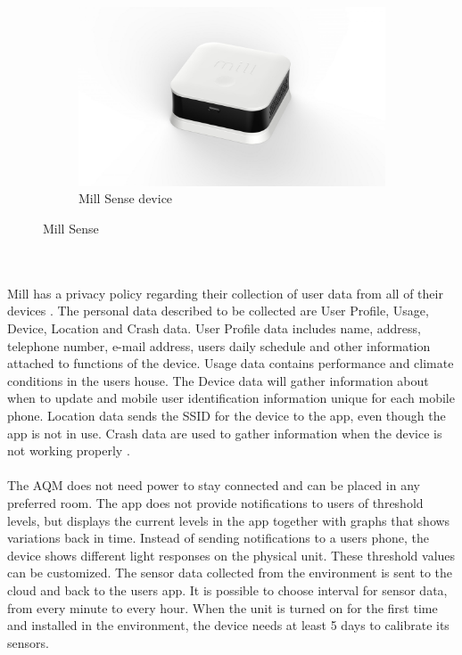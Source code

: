 \begin{figure} [!ht]
\begin{subfigure}{0.3\textwidth}
         \label{fig:MillSenseApp}
     \end{subfigure}
     \hfill
      \begin{subfigure}{0.3\textwidth}
         \centering
         \includegraphics[width=1.5\textwidth]{figures/MillSense.jpg}
         \caption{Mill Sense device \cite{MillSense}}
         \label{fig:MillSenseDev}
     \end{subfigure}
     \hfill
        \caption{Mill Sense}
        \label{fig:MillSenseBoth}
\end{figure}
\\\\
Mill has a privacy policy regarding their collection of user data from all of their devices \cite{MillPrivacy}. The personal data described to be collected are User Profile, Usage, Device, Location and Crash data. User Profile data includes name, address, telephone number, e-mail address, users daily schedule and other information attached to functions of the device. Usage data contains performance and climate conditions in the users house. The Device data will gather information about when to update and mobile user identification information unique for each mobile phone. Location data sends the SSID for the device to the app, even though the app is not in use. Crash data are used to gather information when the device is not working properly \cite{MillPrivacy}. 
\\\\
The AQM does not need power to stay connected and can be placed in any preferred room. The app does not provide notifications to users of threshold levels, but displays the current levels in the app together with graphs that shows variations back in time. Instead of sending notifications to a users phone, the device shows different light responses on the physical unit. These threshold values can be customized. The sensor data collected from the environment is sent to the cloud and back to the users app. It is possible to choose interval for sensor data, from every minute to every hour. When the unit is turned on for the first time and installed in the environment, the device needs at least 5 days to calibrate its sensors. 
\\
